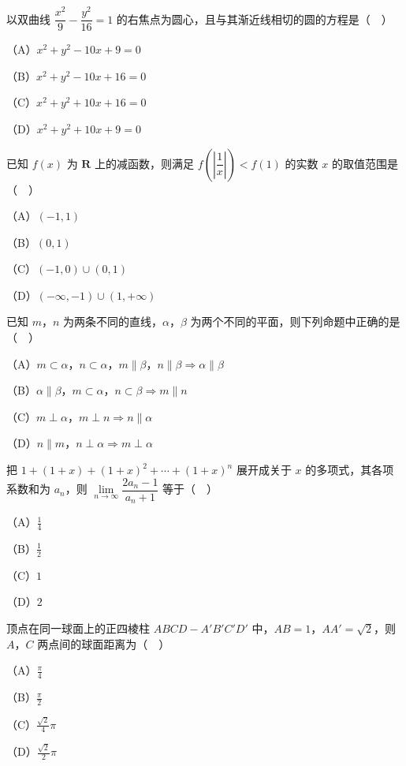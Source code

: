 \begin{question}
以双曲线 $\dfrac{x^2}9-\dfrac{y^2}{16}=1$ 的右焦点为圆心，且与其渐近线相切的圆的方程是（　）

（A）$x^2+y^2-10x+9=0$

（B）$x^2+y^2-10x+16=0$

（C）$x^2+y^2+10x+16=0$

（D）$x^2+y^2+10x+9=0$

\end{question}
\begin{question}
已知 $f(x)$ 为 $\mathbf R$ 上的减函数，则满足 $f\left(\left|\dfrac1x\right|\right)<f(1)$ 的实数 $x$ 的取值范围是（　）

（A）$(-1,1)$

（B）$(0,1)$

（C）$(-1,0)\cup(0,1)$

（D）$(-\infty,-1)\cup(1,+\infty)$

\end{question}
\begin{question}
已知 $m$，$n$ 为两条不同的直线，$\alpha$，$\beta$ 为两个不同的平面，则下列命题中正确的是（　）

（A）$m\subset\alpha$，$n\subset\alpha$，$m\parallel\beta$，$n\parallel\beta\Rightarrow\alpha\parallel\beta$

（B）$\alpha\parallel\beta$，$m\subset\alpha$，$n\subset\beta\Rightarrow m\parallel n$

（C）$m\perp\alpha$，$m\perp n\Rightarrow n\parallel\alpha$

（D）$n\parallel m$，$n\perp\alpha\Rightarrow m\perp\alpha$

\end{question}
\begin{question}
把 $1+(1+x)+(1+x)^2+\cdots+(1+x)^n$ 展开成关于 $x$ 的多项式，其各项系数和为 $a_n$，则 $\lim\limits_{n\to\infty}\dfrac{2a_n-1}{a_n+1}$ 等于（　）

（A）$\frac14$

（B）$\frac12$

（C）$1$

（D）$2$

\end{question}
\begin{question}
顶点在同一球面上的正四棱柱 $ABCD-A'B'C'D'$ 中，$AB=1$，$AA'=\sqrt2$，则 $A$，$C$ 两点间的球面距离为（　）

（A）$\frac{\pi}4$

（B）$\frac{\pi}2$

（C）$\frac{\sqrt2}4\pi$

（D）$\frac{\sqrt2}2\pi$

\end{question}
